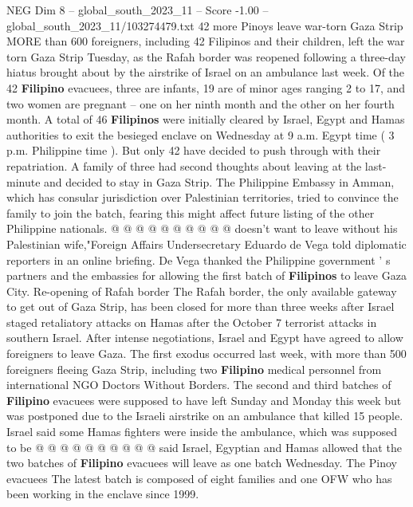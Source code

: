 \begin{textsample}{NEG Dim 8 – global\_south\_2023\_11 – Score -1.00 – global\_south\_2023\_11/103274479.txt}  \label{ex:f8_neg_084}
42 more Pinoys leave war-torn Gaza Strip MORE than 600 foreigners, including 42 Filipinos and their children, left the war torn Gaza Strip Tuesday, as the Rafah border was reopened following a three-day hiatus brought about by the airstrike of Israel on an ambulance last week.
Of the 42 \textbf{Filipino} evacuees, three are infants, 19 are of minor ages ranging 2 to 17, and two women are pregnant -- one on her ninth month and the other on her fourth month.
A total of 46 \textbf{Filipinos} were initially cleared by Israel, Egypt and Hamas authorities to exit the besieged enclave on Wednesday at 9 a.m.
Egypt time ( 3 p.m.
Philippine time ).
But only 42 have decided to push through with their repatriation.
A family of three had second thoughts about leaving at the last-minute and decided to stay in Gaza Strip.
The Philippine Embassy in Amman, which has consular jurisdiction over Palestinian territories, tried to convince the family to join the batch, fearing this might affect future listing of the other Philippine nationals. @ @ @ @ @ @ @ @ @ @ doesn't want to leave without his Palestinian wife,"Foreign Affairs Undersecretary Eduardo de Vega told diplomatic reporters in an online briefing.
De Vega thanked the Philippine government ' s partners and the embassies for allowing the first batch of \textbf{Filipinos} to leave Gaza City.
Re-opening of Rafah border The Rafah border, the only available gateway to get out of Gaza Strip, has been closed for more than three weeks after Israel staged retaliatory attacks on Hamas after the October 7 terrorist attacks in southern Israel.
After intense negotiations, Israel and Egypt have agreed to allow foreigners to leave Gaza.
The first exodus occurred last week, with more than 500 foreigners fleeing Gaza Strip, including two \textbf{Filipino} medical personnel from international NGO Doctors Without Borders.
The second and third batches of \textbf{Filipino} evacuees were supposed to have left Sunday and Monday this week but was postponed due to the Israeli airstrike on an ambulance that killed 15 people.
Israel said some Hamas fighters were inside the ambulance, which was supposed to be @ @ @ @ @ @ @ @ @ @ said Israel, Egyptian and Hamas allowed that the two batches of \textbf{Filipino} evacuees will leave as one batch Wednesday.
The Pinoy evacuees The latest batch is composed of eight families and one OFW who has been working in the enclave since 1999.

\end{textsample}
